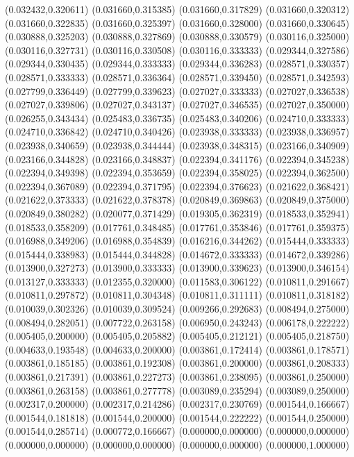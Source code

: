 (0.032432,0.320611)
(0.031660,0.315385)
(0.031660,0.317829)
(0.031660,0.320312)
(0.031660,0.322835)
(0.031660,0.325397)
(0.031660,0.328000)
(0.031660,0.330645)
(0.030888,0.325203)
(0.030888,0.327869)
(0.030888,0.330579)
(0.030116,0.325000)
(0.030116,0.327731)
(0.030116,0.330508)
(0.030116,0.333333)
(0.029344,0.327586)
(0.029344,0.330435)
(0.029344,0.333333)
(0.029344,0.336283)
(0.028571,0.330357)
(0.028571,0.333333)
(0.028571,0.336364)
(0.028571,0.339450)
(0.028571,0.342593)
(0.027799,0.336449)
(0.027799,0.339623)
(0.027027,0.333333)
(0.027027,0.336538)
(0.027027,0.339806)
(0.027027,0.343137)
(0.027027,0.346535)
(0.027027,0.350000)
(0.026255,0.343434)
(0.025483,0.336735)
(0.025483,0.340206)
(0.024710,0.333333)
(0.024710,0.336842)
(0.024710,0.340426)
(0.023938,0.333333)
(0.023938,0.336957)
(0.023938,0.340659)
(0.023938,0.344444)
(0.023938,0.348315)
(0.023166,0.340909)
(0.023166,0.344828)
(0.023166,0.348837)
(0.022394,0.341176)
(0.022394,0.345238)
(0.022394,0.349398)
(0.022394,0.353659)
(0.022394,0.358025)
(0.022394,0.362500)
(0.022394,0.367089)
(0.022394,0.371795)
(0.022394,0.376623)
(0.021622,0.368421)
(0.021622,0.373333)
(0.021622,0.378378)
(0.020849,0.369863)
(0.020849,0.375000)
(0.020849,0.380282)
(0.020077,0.371429)
(0.019305,0.362319)
(0.018533,0.352941)
(0.018533,0.358209)
(0.017761,0.348485)
(0.017761,0.353846)
(0.017761,0.359375)
(0.016988,0.349206)
(0.016988,0.354839)
(0.016216,0.344262)
(0.015444,0.333333)
(0.015444,0.338983)
(0.015444,0.344828)
(0.014672,0.333333)
(0.014672,0.339286)
(0.013900,0.327273)
(0.013900,0.333333)
(0.013900,0.339623)
(0.013900,0.346154)
(0.013127,0.333333)
(0.012355,0.320000)
(0.011583,0.306122)
(0.010811,0.291667)
(0.010811,0.297872)
(0.010811,0.304348)
(0.010811,0.311111)
(0.010811,0.318182)
(0.010039,0.302326)
(0.010039,0.309524)
(0.009266,0.292683)
(0.008494,0.275000)
(0.008494,0.282051)
(0.007722,0.263158)
(0.006950,0.243243)
(0.006178,0.222222)
(0.005405,0.200000)
(0.005405,0.205882)
(0.005405,0.212121)
(0.005405,0.218750)
(0.004633,0.193548)
(0.004633,0.200000)
(0.003861,0.172414)
(0.003861,0.178571)
(0.003861,0.185185)
(0.003861,0.192308)
(0.003861,0.200000)
(0.003861,0.208333)
(0.003861,0.217391)
(0.003861,0.227273)
(0.003861,0.238095)
(0.003861,0.250000)
(0.003861,0.263158)
(0.003861,0.277778)
(0.003089,0.235294)
(0.003089,0.250000)
(0.002317,0.200000)
(0.002317,0.214286)
(0.002317,0.230769)
(0.001544,0.166667)
(0.001544,0.181818)
(0.001544,0.200000)
(0.001544,0.222222)
(0.001544,0.250000)
(0.001544,0.285714)
(0.000772,0.166667)
(0.000000,0.000000)
(0.000000,0.000000)
(0.000000,0.000000)
(0.000000,0.000000)
(0.000000,0.000000)
(0.000000,1.000000)